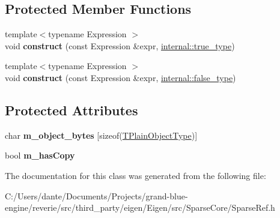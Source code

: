\subsection*{Protected Member Functions}
\begin{DoxyCompactItemize}
\item 
\mbox{\label{class_eigen_1_1_ref_3_01const_01_sparse_matrix_3_01_mat_scalar_00_01_mat_options_00_01_mat_index1bbfd78857ba9c14d54178cb3009ac38_a12064569c004e296512a2392fc42ead6}} 
{\footnotesize template$<$typename Expression $>$ }\\void {\bfseries construct} (const Expression \&expr, \mbox{\hyperlink{struct_eigen_1_1internal_1_1true__type}{internal\+::true\+\_\+type}})
\item 
\mbox{\label{class_eigen_1_1_ref_3_01const_01_sparse_matrix_3_01_mat_scalar_00_01_mat_options_00_01_mat_index1bbfd78857ba9c14d54178cb3009ac38_adbf43a3cd2ee0d0f95a06fb3c9a1a9e7}} 
{\footnotesize template$<$typename Expression $>$ }\\void {\bfseries construct} (const Expression \&expr, \mbox{\hyperlink{struct_eigen_1_1internal_1_1false__type}{internal\+::false\+\_\+type}})
\end{DoxyCompactItemize}
\subsection*{Protected Attributes}
\begin{DoxyCompactItemize}
\item 
\mbox{\label{class_eigen_1_1_ref_3_01const_01_sparse_matrix_3_01_mat_scalar_00_01_mat_options_00_01_mat_index1bbfd78857ba9c14d54178cb3009ac38_ab50f00d5a42abd482844592c1a18efcd}} 
char {\bfseries m\+\_\+object\+\_\+bytes} \mbox{[}sizeof(\mbox{\hyperlink{class_eigen_1_1_sparse_matrix}{T\+Plain\+Object\+Type}})\mbox{]}
\item 
\mbox{\label{class_eigen_1_1_ref_3_01const_01_sparse_matrix_3_01_mat_scalar_00_01_mat_options_00_01_mat_index1bbfd78857ba9c14d54178cb3009ac38_abec17deb79f1e51209e9df1b2f421d9b}} 
bool {\bfseries m\+\_\+has\+Copy}
\end{DoxyCompactItemize}


The documentation for this class was generated from the following file\+:\begin{DoxyCompactItemize}
\item 
C\+:/\+Users/dante/\+Documents/\+Projects/grand-\/blue-\/engine/reverie/src/third\+\_\+party/eigen/\+Eigen/src/\+Sparse\+Core/Sparse\+Ref.\+h\end{DoxyCompactItemize}
